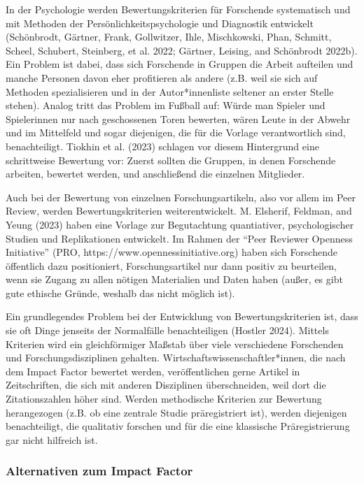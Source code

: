 \documentclass[
  letterpaper,
  DIV=11,
  numbers=noendperiod]{scrreprt}
\begin{document}
In der Psychologie werden Bewertungskriterien für Forschende
systematisch und mit Methoden der Persönlichkeitspsychologie und
Diagnostik entwickelt (Schönbrodt, Gärtner, Frank, Gollwitzer, Ihle,
Mischkowski, Phan, Schmitt, Scheel, Schubert, Steinberg, et al. 2022;
Gärtner, Leising, and Schönbrodt 2022b). Ein Problem ist dabei, dass
sich Forschende in Gruppen die Arbeit aufteilen und manche Personen
davon eher profitieren als andere (z.B. weil sie sich auf Methoden
spezialisieren und in der Autor*innenliste seltener an erster Stelle
stehen). Analog tritt das Problem im Fußball auf: Würde man Spieler und
Spielerinnen nur nach geschossenen Toren bewerten, wären Leute in der
Abwehr und im Mittelfeld und sogar diejenigen, die für die Vorlage
verantwortlich sind, benachteiligt. Tiokhin et al. (2023) schlagen vor
diesem Hintergrund eine schrittweise Bewertung vor: Zuerst sollten die
Gruppen, in denen Forschende arbeiten, bewertet werden, und anschließend
die einzelnen Mitglieder.

Auch bei der Bewertung von einzelnen Forschungsartikeln, also vor allem
im Peer Review, werden Bewertungskriterien weiterentwickelt. M.
Elsherif, Feldman, and Yeung (2023) haben eine Vorlage zur Begutachtung
quantiativer, psychologischer Studien und Replikationen entwickelt. Im
Rahmen der ``Peer Reviewer Openness Initiative'' (PRO,
https://www.opennessinitiative.org) haben sich Forschende öffentlich
dazu positioniert, Forschungsartikel nur dann positiv zu beurteilen,
wenn sie Zugang zu allen nötigen Materialien und Daten haben (außer, es
gibt gute ethische Gründe, weshalb das nicht möglich ist).

Ein grundlegendes Problem bei der Entwicklung von Bewertungskriterien
ist, dass sie oft Dinge jenseits der Normalfälle benachteiligen (Hostler
2024). Mittels Kriterien wird ein gleichförmiger Maßstab über viele
verschiedene Forschenden und Forschungsdisziplinen gehalten.
Wirtschaftswissenschaftler*innen, die nach dem Impact Factor bewertet
werden, veröffentlichen gerne Artikel in Zeitschriften, die sich mit
anderen Disziplinen überschneiden, weil dort die Zitationszahlen höher
sind. Werden methodische Kriterien zur Bewertung herangezogen (z.B. ob
eine zentrale Studie präregistriert ist), werden diejenigen
benachteiligt, die qualitativ forschen und für die eine klassische
Präregistrierung gar nicht hilfreich ist.

\subsubsection{Alternativen zum Impact
Factor}\label{alternativen-zum-impact-factor}
\end{document}
